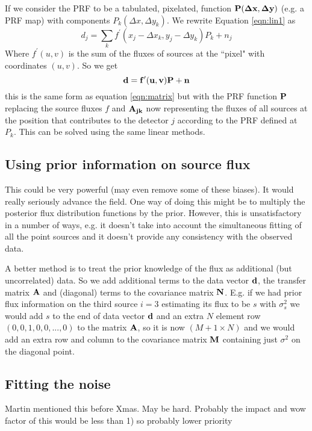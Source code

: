 \documentclass{article}
\begin{document}
If we consider the PRF to be a tabulated, pixelated, function ${\bf P}({\bf \Delta x}, {\bf \Delta y})$ (e.g. a PRF map) with components $P_k( \Delta x, \Delta y_k)$. We rewrite Equation \ref{eqn:lin1} as
 \begin{equation}
d_j=\sum_k{f^\prime(x_j-\Delta x_k, y_j-\Delta y_k)}P_k+n_j \label{eqn:lin2}
 \end{equation}
Where $f^\prime(u,v)$ is the sum of the fluxes of sources at the ``pixel" with coordinates $(u,v)$. So we get 
\begin{equation}
{\bf d}={\bf f}^\prime({\bf u},{\bf v}){\bf P}+{\bf n}\label{eqn:linprf2}
\end{equation}
this is the same form as equation \ref{eqn:matrix} but with the PRF function ${\bf P}$ replacing the source fluxes $f$ and ${\bf A_{jk}}$ now representing the fluxes of all sources at the position that contributes to the detector $j$ according to the PRF defined at $P_k$. This can be solved using the same linear methods.
\subsection{Using prior information on source flux}
 This could be very powerful (may even remove some of these biases).  It would really seriously advance the field.  One way of doing this might be to multiply the posterior flux distribution functions by the prior.  However, this is unsatisfactory in a number of ways, e.g. it doesn't take into account the simultaneous fitting of all the point sources and it doesn't provide any consistency with the observed data. 
 
 A better method is to treat the prior knowledge of the flux as additional (but uncorrelated) data.  So we add additional terms to the data vector ${\bf d}$, the transfer matrix ${\bf A}$ and (diagonal) terms to the covariance matrix ${\bf N}$.  E.g. if we had prior flux information on the third source $i=3$ estimating its flux to be $s$ with $\sigma^2_s$ we would add $s$ to the end of data vector ${\bf d}$ and an extra $N$ element row $(0,0,1,0,0,...,0)$ to the matrix ${\bf A}$, so it is now $(M+1 \times N)$  and we would add an extra row and column to the covariance matrix ${\bf M}$ containing just $\sigma^2$ on the diagonal point.

\subsection{Fitting the noise}
	Martin mentioned this before Xmas.  May be hard.  Probably the impact and wow factor of this would be less than 1) so probably lower priority
\end{document}
